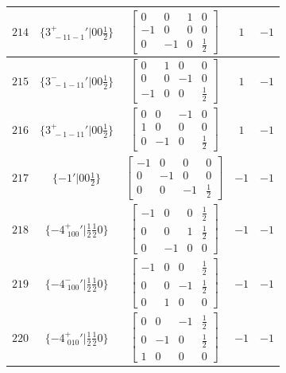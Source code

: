 \documentclass[fleqn,8pt]{jsarticle}
\begin{document}
\begin{longtable}{ccccc}
$ 214 $ & $ \{3^{+}_{\,\,-11-1}{}'|0 0 \frac{1}{2}\} $ & $ \begin{bmatrix} 0 & 0 & 1 & 0 \\ -1 & 0 & 0 & 0 \\ 0 & -1 & 0 & \frac{1}{2} \end{bmatrix} $ & $ 1 $ & $ -1 $ \\ \hline
$ 215 $ & $ \{3^{-}_{\,\,-1-11}{}'|0 0 \frac{1}{2}\} $ & $ \begin{bmatrix} 0 & 1 & 0 & 0 \\ 0 & 0 & -1 & 0 \\ -1 & 0 & 0 & \frac{1}{2} \end{bmatrix} $ & $ 1 $ & $ -1 $ \\ \hline
$ 216 $ & $ \{3^{+}_{\,\,-1-11}{}'|0 0 \frac{1}{2}\} $ & $ \begin{bmatrix} 0 & 0 & -1 & 0 \\ 1 & 0 & 0 & 0 \\ 0 & -1 & 0 & \frac{1}{2} \end{bmatrix} $ & $ 1 $ & $ -1 $ \\ \hline
$ 217 $ & $ \{-1{}'|0 0 \frac{1}{2}\} $ & $ \begin{bmatrix} -1 & 0 & 0 & 0 \\ 0 & -1 & 0 & 0 \\ 0 & 0 & -1 & \frac{1}{2} \end{bmatrix} $ & $ -1 $ & $ -1 $ \\ \hline
$ 218 $ & $ \{-4^{+}_{\,\,100}{}'|\frac{1}{2} \frac{1}{2} 0\} $ & $ \begin{bmatrix} -1 & 0 & 0 & \frac{1}{2} \\ 0 & 0 & 1 & \frac{1}{2} \\ 0 & -1 & 0 & 0 \end{bmatrix} $ & $ -1 $ & $ -1 $ \\ \hline
$ 219 $ & $ \{-4^{-}_{\,\,100}{}'|\frac{1}{2} \frac{1}{2} 0\} $ & $ \begin{bmatrix} -1 & 0 & 0 & \frac{1}{2} \\ 0 & 0 & -1 & \frac{1}{2} \\ 0 & 1 & 0 & 0 \end{bmatrix} $ & $ -1 $ & $ -1 $ \\ \hline
$ 220 $ & $ \{-4^{+}_{\,\,010}{}'|\frac{1}{2} \frac{1}{2} 0\} $ & $ \begin{bmatrix} 0 & 0 & -1 & \frac{1}{2} \\ 0 & -1 & 0 & \frac{1}{2} \\ 1 & 0 & 0 & 0 \end{bmatrix} $ & $ -1 $ & $ -1 $ \\ \hline

\end{longtable}
\end{document}
